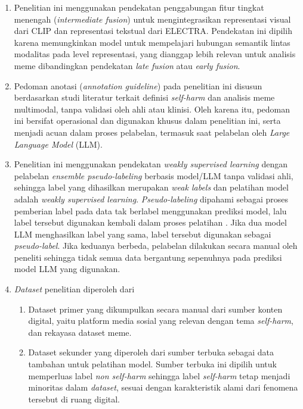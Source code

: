 \begin{enumerate}
    \item Penelitian ini menggunakan pendekatan penggabungan fitur tingkat menengah (\textit{intermediate fusion}) untuk mengintegrasikan representasi visual dari CLIP dan representasi tekstual dari ELECTRA. Pendekatan ini dipilih karena memungkinkan model untuk mempelajari hubungan semantik lintas modalitas pada level representasi, yang dianggap lebih relevan untuk analisis meme dibandingkan pendekatan \textit{late fusion} atau \textit{early fusion}.
    
    \item Pedoman anotasi (\textit{annotation guideline}) pada penelitian ini disusun berdasarkan studi literatur terkait definisi \textit{self-harm} dan analisis meme multimodal, tanpa validasi oleh ahli atau klinisi. Oleh karena itu, pedoman ini bersifat operasional dan digunakan khusus dalam penelitian ini, serta menjadi acuan dalam proses pelabelan, termasuk saat pelabelan oleh \textit{Large Language Model} (LLM).
    
    \item Penelitian ini menggunakan pendekatan \textit{weakly supervised learning} dengan pelabelan \textit{ensemble pseudo-labeling} berbasis model/LLM tanpa validasi ahli, sehingga label yang dihasilkan merupakan \textit{weak labels} dan pelatihan model adalah \textit{weakly supervised learning}. \textit{Pseudo-labeling} dipahami sebagai proses pemberian label pada data tak berlabel menggunakan prediksi model, lalu label tersebut digunakan kembali dalam proses pelatihan \cite{lee2013pseudo}. Jika dua model LLM menghasilkan label yang sama, label tersebut digunakan sebagai \textit{pseudo-label}. Jika keduanya berbeda, pelabelan dilakukan secara manual oleh peneliti sehingga tidak semua data bergantung sepenuhnya pada prediksi model LLM yang digunakan. 

    \item \textit{Dataset} penelitian diperoleh dari 
    \begin{enumerate}
        \item Dataset primer yang dikumpulkan secara manual dari sumber konten digital, yaitu platform media sosial yang relevan dengan tema \textit{self-harm}, dan rekayasa dataset meme.
        \item Dataset sekunder yang diperoleh dari sumber terbuka sebagai data tambahan untuk pelatihan model. Sumber terbuka ini dipilih untuk memperluas label \textit{non self-harm} sehingga label \textit{self-harm} tetap menjadi minoritas dalam \textit{dataset}, sesuai dengan karakteristik alami dari fenomena tersebut di ruang digital.
    \end{enumerate}


\end{enumerate}
